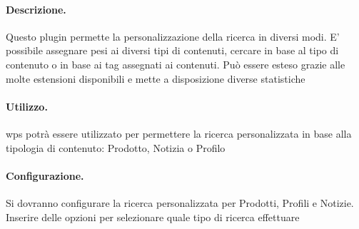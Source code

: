 \paragraph{Descrizione.} Questo plugin permette la personalizzazione della ricerca in diversi modi. E' possibile assegnare pesi ai diversi tipi di contenuti, cercare in base al tipo di contenuto o in base ai tag assegnati ai contenuti. Può essere esteso grazie alle molte estensioni disponibili e mette a disposizione diverse statistiche
\paragraph{Utilizzo.} \gls{wps} potrà essere utilizzato per permettere la ricerca personalizzata in base alla tipologia di contenuto: Prodotto, Notizia o Profilo
\paragraph{Configurazione.} Si dovranno configurare la ricerca personalizzata per Prodotti, Profili e Notizie. Inserire delle opzioni per selezionare quale tipo di ricerca effettuare


